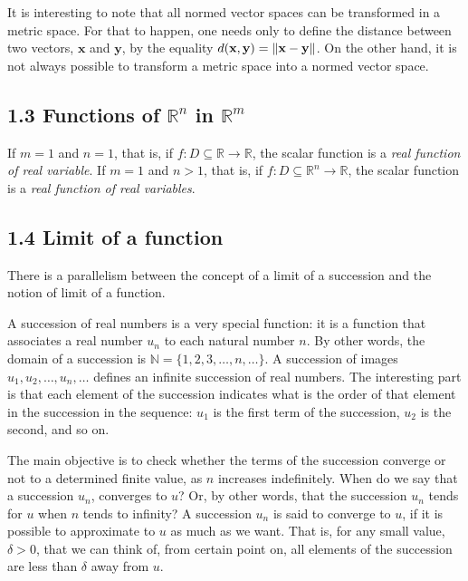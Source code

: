 \documentclass[0pt, a4paper]{article}
\begin{document}
It is interesting to note that all normed vector spaces can be transformed in a metric space. For that to happen, one needs only to define the distance between two vectors, $\textbf{x}$ and $\textbf{y}$, by the equality $d(\textbf{x}, \textbf{y}) = \norm{\textbf{x}-\textbf{y}}$. On the other hand, it is not always possible to transform a metric space into a normed vector space.

\subsection*{1.3 Functions of $\mathbb{R}^n$ in $\mathbb{R}^m$}

If $m=1$ and $n=1$, that is, if $f:D \subseteq \mathbb{R} \rightarrow \mathbb{R}$, the scalar function is a \textit{real function of real variable}. If $m=1$ and $n>1$, that is, if $f:D \subseteq \mathbb{R}^n \rightarrow \mathbb{R}$, the scalar function is a \textit{real function of real variables}.

\subsection*{1.4 Limit of a function}

There is a parallelism between the concept of a limit of a succession and the notion of limit of a function.

A succession of real numbers is a very special function: it is a function that associates a real number $u_n$ to each natural number $n$. By other words, the domain of a succession is $\mathbb{N}=\{1,2,3,\dots, n, \dots\}$. A succession of images $u_1, u_2, \dots, u_n, \dots$ defines an infinite succession of real numbers. The interesting part is that each element of the succession indicates what is the order of that element in the succession in the sequence: $u_1$ is the first term of the succession, $u_2$ is the second, and so on.

The main objective is to check whether the terms of the succession converge or not to a determined finite value, as $n$ increases indefinitely. When do we say that a succession $u_n$, converges to $u$? Or, by other words, that the succession $u_n$ tends for $u$ when $n$ tends to infinity? A succession $u_n$ is said to converge to $u$, if it is possible to approximate to $u$ as much as we want. That is, for any small value, $\delta>0$, that we can think of, from certain point on, all elements of the succession are less than $\delta$ away from $u$.
\end{document}
